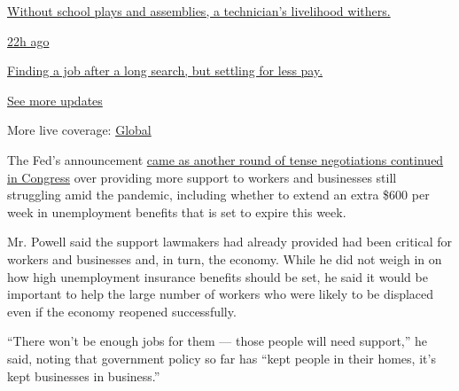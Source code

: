 \href{https://www.nytimes3xbfgragh.onion/live/2020/08/20/business/stock-market-today-coronavirus?action=click\&pgtype=Article\&state=default\&region=MAIN_CONTENT_1\&context=storylines_live_updates\#without-school-plays-and-assemblies-a-technicians-livelihood-withers}{Without
school plays and assemblies, a technician's livelihood withers.}

\href{https://www.nytimes3xbfgragh.onion/live/2020/08/20/business/stock-market-today-coronavirus?action=click\&pgtype=Article\&state=default\&region=MAIN_CONTENT_1\&context=storylines_live_updates\#finding-a-job-after-a-long-search-but-settling-for-less-pay}{22h
ago}

\href{https://www.nytimes3xbfgragh.onion/live/2020/08/20/business/stock-market-today-coronavirus?action=click\&pgtype=Article\&state=default\&region=MAIN_CONTENT_1\&context=storylines_live_updates\#finding-a-job-after-a-long-search-but-settling-for-less-pay}{Finding
a job after a long search, but settling for less pay.}

\href{https://www.nytimes3xbfgragh.onion/live/2020/08/20/business/stock-market-today-coronavirus?action=click\&pgtype=Article\&state=default\&region=MAIN_CONTENT_1\&context=storylines_live_updates}{See
more updates}

More live coverage:
\href{https://www.nytimes3xbfgragh.onion/2020/08/21/world/covid-19-coronavirus.html?action=click\&pgtype=Article\&state=default\&region=MAIN_CONTENT_1\&context=storylines_live_updates}{Global}

The Fed's announcement
\href{https://www.nytimes3xbfgragh.onion/2020/07/28/business/us-lawmakers-deliberate-over-another-aid-package.html}{came
as another round of tense negotiations continued in Congress} over
providing more support to workers and businesses still struggling amid
the pandemic, including whether to extend an extra \$600 per week in
unemployment benefits that is set to expire this week.

Mr. Powell said the support lawmakers had already provided had been
critical for workers and businesses and, in turn, the economy. While he
did not weigh in on how high unemployment insurance benefits should be
set, he said it would be important to help the large number of workers
who were likely to be displaced even if the economy reopened
successfully.

``There won't be enough jobs for them --- those people will need
support,'' he said, noting that government policy so far has ``kept
people in their homes, it's kept businesses in business.''

